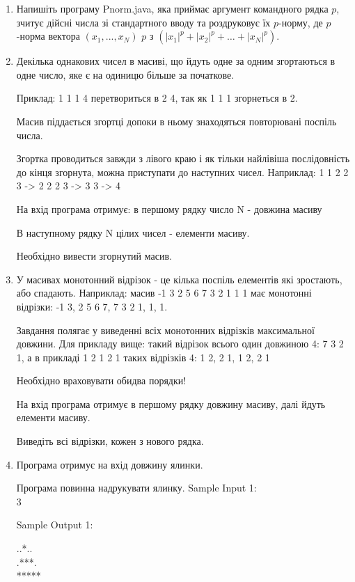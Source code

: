 \documentclass[]{article}
\begin{document}
\begin{enumerate}
\item Напишіть програму Pnorm.java, яка приймає аргумент командного рядка $p$,
зчитує дійсні числа зі стандартного вводу та роздруковує їх $p$-норму, 
де $p$-норма вектора $(x_{1}, ..., x_{N})$  $p$ з $(|x_{1}|^{p} + |x_{2}|^{p} + \ldots + | x_{N}|^{p})$.


\item
Декілька однакових чисел в масиві, що йдуть одне за одним згортаються в одне число, яке є на одиницю більше за початкове.

Приклад: 1 1 1 4 перетвориться в 2 4, так як 1 1 1 згорнеться в 2.

Масив піддається згортці допоки в ньому знаходяться повторювані поспіль числа.

Згортка проводиться завжди з лівого краю і як тільки найлівіша послідовність до кінця згорнута,
можна приступати до наступних чисел. Наприклад: 1 1 2 2 3 -> 2 2 2 3 -> 3 3 -> 4

На вхід програма отримує: в першому рядку число N - довжина масиву

В наступному рядку N цілих чисел - елементи масиву.

Необхідно вивести згорнутий масив.

\item

У масивах монотонний відрізок - це кілька поспіль елементів які зростають, або спадають.
Наприклад: масив -1 3 2 5 6 7 3 2 1 1 1 має монотонні відрізки: -1 3, 2 5 6 7, 7 3 2 1, 1, 1.

Завдання полягає у виведенні всіх монотонних відрізків максимальної довжини.
Для прикладу вище: такий відрізок всього один довжиною 4: 7 3 2 1, а в
прикладі 1 2 1 2 1 таких відрізків 4: 1 2, 2 1, 1 2, 2 1

Необхідно враховувати обидва порядки!

На вхід програма отримує в першому рядку довжину масиву, далі йдуть елементи масиву.

Виведіть всі відрізки, кожен з нового рядка.

\item
Програма отримує на вхід довжину ялинки.

Програма повинна надрукувати ялинку.
Sample Input 1:\\

3

Sample Output 1:

..*..\\
.***.\\
*****\\


\end{enumerate}
\end{document}
